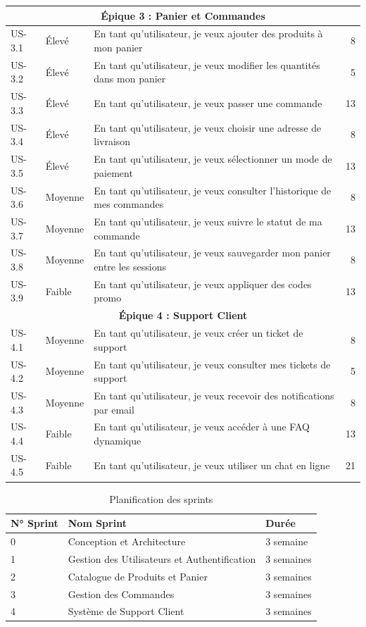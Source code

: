 \documentclass[12pt,a4paper]{report}
\begin{document}
\begin{longtable}{|l|l|p{7cm}|r|}
\multicolumn{4}{|c|}{\textbf{Épique 3 : Panier et Commandes}} \\ \hline
US-3.1 & Élevé & En tant qu'utilisateur, je veux ajouter des produits à mon panier & 8 \\ \hline
US-3.2 & Élevé & En tant qu'utilisateur, je veux modifier les quantités dans mon panier & 5 \\ \hline
US-3.3 & Élevé & En tant qu'utilisateur, je veux passer une commande & 13 \\ \hline
US-3.4 & Élevé & En tant qu'utilisateur, je veux choisir une adresse de livraison & 8 \\ \hline
US-3.5 & Élevé & En tant qu'utilisateur, je veux sélectionner un mode de paiement & 13 \\ \hline
US-3.6 & Moyenne & En tant qu'utilisateur, je veux consulter l'historique de mes commandes & 8 \\ \hline
US-3.7 & Moyenne & En tant qu'utilisateur, je veux suivre le statut de ma commande & 13 \\ \hline
US-3.8 & Moyenne & En tant qu'utilisateur, je veux sauvegarder mon panier entre les sessions & 8 \\ \hline
US-3.9 & Faible & En tant qu'utilisateur, je veux appliquer des codes promo & 13 \\ \hline

\multicolumn{4}{|c|}{\textbf{Épique 4 : Support Client}} \\ \hline
US-4.1 & Moyenne & En tant qu'utilisateur, je veux créer un ticket de support & 8 \\ \hline
US-4.2 & Moyenne & En tant qu'utilisateur, je veux consulter mes tickets de support & 5 \\ \hline
US-4.3 & Moyenne & En tant qu'utilisateur, je veux recevoir des notifications par email & 8 \\ \hline
US-4.4 & Faible & En tant qu'utilisateur, je veux accéder à une FAQ dynamique & 13 \\ \hline
US-4.5 & Faible & En tant qu'utilisateur, je veux utiliser un chat en ligne & 21 \\ \hline
\end{longtable}



\begin{table}[H]
\centering
\begin{tabularx}{\textwidth}{|X|X|X|}
\hline
\textbf{N° Sprint} & \textbf{Nom Sprint} & \textbf{Durée} \\
\hline
0 & Conception et Architecture & 3 semaine \\
\hline
1 & Gestion des Utilisateurs et Authentification & 3 semaines \\
\hline
2 & Catalogue de Produits et Panier & 3 semaines \\
\hline
3 & Gestion des Commandes & 3 semaines \\
\hline
4 & Système de Support Client & 3 semaines \\
\hline
\end{tabularx}
\caption{Planification des sprints}
\label{tab:sprint_planning}
\end{table}
\end{document}
